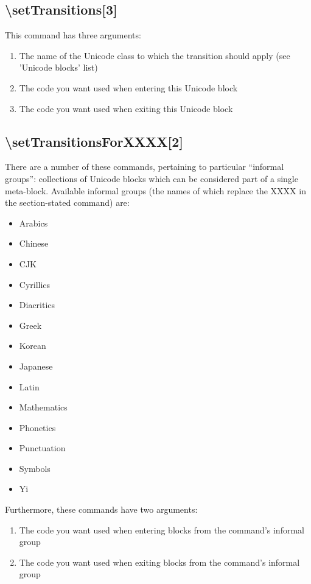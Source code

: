 ﻿\documentclass{article}
\newenvironment{itemlist}{%
  \begin{itemize}
	\setlength{\itemsep}{0pt}
	\setlength{\parsep}{0pt}
	\setlength{\topsep}{0pt}
	\setlength{\partopsep}{0pt}
	\setlength{\parskip}{0pt}
	\setlength{\labelsep}{5pt}}%
{
  \end{itemize}}
\newenvironment{numberlist}{%
  \begin{enumerate}
	\setlength{\itemsep}{0pt}
	\setlength{\parsep}{0pt}
	\setlength{\topsep}{0pt}
	\setlength{\partopsep}{0pt}
	\setlength{\parskip}{0pt}
	\setlength{\labelsep}{5pt}}%
{
  \end{enumerate}}
\begin{document}
		\subsection{\textbackslash setTransitions[3]}
		
			This command has three arguments:	
		
			\begin{numberlist}
				\item The name of the Unicode class to which the transition should apply (see 'Unicode blocks' list)
				\item The code you want used when entering this Unicode block
				\item The code you want used when exiting this Unicode block
			\end{numberlist}

		\subsection{\textbackslash setTransitionsForXXXX[2]}

			There are a number of these commands, pertaining to particular “informal groups”: collections of Unicode blocks which can be considered part of a single meta-block. Available informal groups (the names of which replace the XXXX in the section-stated command) are:
			
			\begin{itemlist}
				\item Arabics
				\item Chinese
				\item CJK
				\item Cyrillics
				\item Diacritics
				\item Greek
				\item Korean
				\item Japanese
				\item Latin
				\item Mathematics
				\item Phonetics
				\item Punctuation
				\item Symbols
				\item Yi
			\end{itemlist}
			
			Furthermore, these commands have two arguments:
			
			\begin{numberlist}
				\item The code you want used when entering blocks from the command's informal group
				\item The code you want used when exiting blocks from the command's informal group
			\end{numberlist}
		
\end{document}
